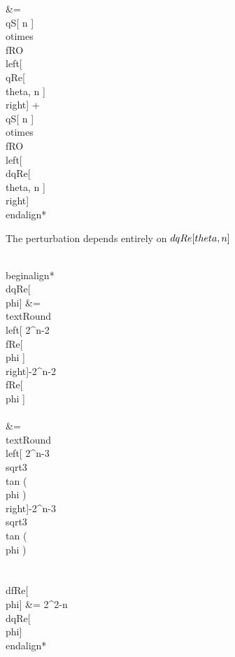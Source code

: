                    &= \\qS[ n ]  \\otimes \\fRO \\left[ \\qRe[ \\theta, n ]   \\right]  + \\qS[ n ]  \\otimes \\fRO \\left[ \\dqRe[ \\theta, n ]  \\right]  
\\end{align*}

The perturbation depends entirely on $\\dqRe[\\theta,n]$ 

\\begin{align*}
\\dqRe[\\phi] &= \\text{Round}\\left[ 2^{n-2} \\fRe[\\phi ] \\right]-2^{n-2}\\fRe[\\phi ] \\\\
&=  \\text{Round}\\left[ 2^{n-3}\\sqrt{3} \\tan (\\phi ) \\right]-2^{n-3}\\sqrt{3} \\tan (\\phi )\\\\
\\dfRe[\\phi] &= 2^{2-n} \\dqRe[\\phi]  
\\end{align*}

